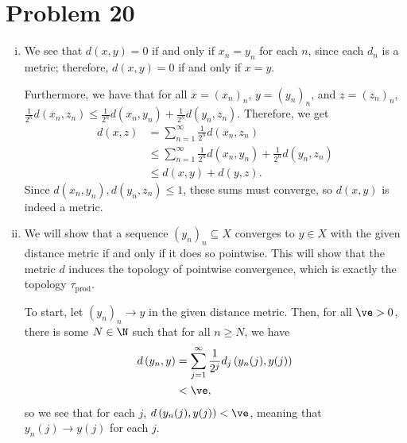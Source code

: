 \documentclass[10pt]{mypackage}
\begin{document}
\section{Problem 20}%
\begin{enumerate}[(i)]
  \item We see that $d\left( x,y \right) = 0$ if and only if $x_n = y_n$ for each $n$, since each $d_n$ is a metric; therefore, $d\left( x,y \right) = 0$ if and only if $x = y$.\newline

    Furthermore, we have that for all $x = \left( x_n \right)_n$, $y = \left( y_n \right)_n$, and $z = \left( z_n \right)_n$, $\frac{1}{2^{n}}d\left( x_n,z_n \right) \leq \frac{1}{2^{n}}d\left( x_n,y_n \right) + \frac{1}{2^{n}}d\left( y_n,z_n \right)$. Therefore, we get
    \begin{align*}
      d\left( x,z \right) &= \sum_{n=1}^{\infty} \frac{1}{2^{n}}d\left( x_n,z_n \right)\\
                          &\leq \sum_{n=1}^{\infty}\frac{1}{2^{n}}d\left( x_n,y_n \right) + \frac{1}{2^{n}}d\left( y_n,z_n \right)\\
                          &\leq d\left( x,y \right) + d\left( y,z \right).
    \end{align*}
    Since $d\left( x_n,y_n \right),d\left( y_n,z_n \right) \leq 1$, these sums must converge, so $d\left( x,y \right)$ is indeed a metric.
  \item We will show that a sequence $\left( y_n \right)_n\subseteq X$ converges to $y\in X$ with the given distance metric if and only if it does so pointwise. This will show that the metric $d$ induces the topology of pointwise convergence, which is exactly the topology $\tau_{\text{prod}}$.\newline

    To start, let $\left( y_n \right)_n\rightarrow y$ in the given distance metric. Then, for all $\ve > 0$, there is some $N\in \N$ such that for all $n \geq N$, we have
    \begin{align*}
      d\left( y_n,y \right) &= \sum_{j=1}^{\infty}\frac{1}{2^{j}} d_j\left( y_n(j),y(j) \right)\\
                            &< \ve,
    \end{align*}
    so we see that for each $j$, $d\left( y_n(j),y(j) \right) < \ve$, meaning that $y_n(j)\rightarrow y(j)$ for each $j$.\newline


\end{enumerate}
\end{document}
